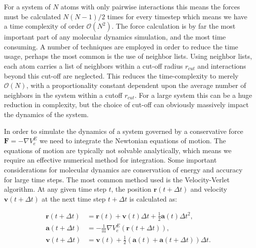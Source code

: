 For a system of $N$ atoms with only pairwise interactions
this means the forces must be calculated $N(N-1)/2$ times
for every timestep which means we have a time complexity
of order $\mathcal{O}(N^2)$. The force calculation is by far
the most important part of any molecular dynamics simulation,
and the most time consuming.
A number of techniques are employed in order to reduce
the time usage, perhaps the most common is the use of neighbor
lists. Using neighbor lists, each atom carries a list of neighbors
within a cut-off radius $r_{cut}$ and interactions
beyond this cut-off are neglected.
This reduces the time-complexity to merely
$\mathcal{O}(N)$, with a proportionality constant
dependent upon the average number of neighbors in the system
within a cutoff $r_{cut}$. For a large system this can be a
huge reduction in complexity, but the choice of cut-off
can obviously massively impact the dynamics of the system.
\par
In order to simulate the dynamics of a system governed by
a conservative force $\bm{F} = - \nabla V_e^E$
we need to integrate the Newtonian equations of motion.
The equations of motion are typically not solvable
analytically, which means we require an effective numerical
method for integration. Some important considerations
for molecular dynamics are conservation of energy
and accuracy for large time steps.
The most common method used is the Velocity-Verlet algorithm.
At any given time step $t$, the position $\bm{r}(t + \Delta t)$
and velocity $\bm{v}(t + \Delta t)$ at the next time step
$t + \Delta t$ is calculated as:

\begin{equation}
    \begin{split}
        \bm{r}(t + \Delta t)
        &= \bm{r}(t) + \bm{v}(t) \Delta t
        + \frac{1}{2} \bm{a}(t)\Delta t^2 , \\
        \bm{a}(t + \Delta t)
        &= -\frac{1}{m} \nabla V_e^E(\bm{r}(t + \Delta t)) , \\
        \bm{v}(t + \Delta t)
        &= \bm{v}(t) + \frac{1}{2}
        (\bm{a}(t) + \bm{a}(t + \Delta t)) \Delta t .
    \end{split}
\end{equation}

